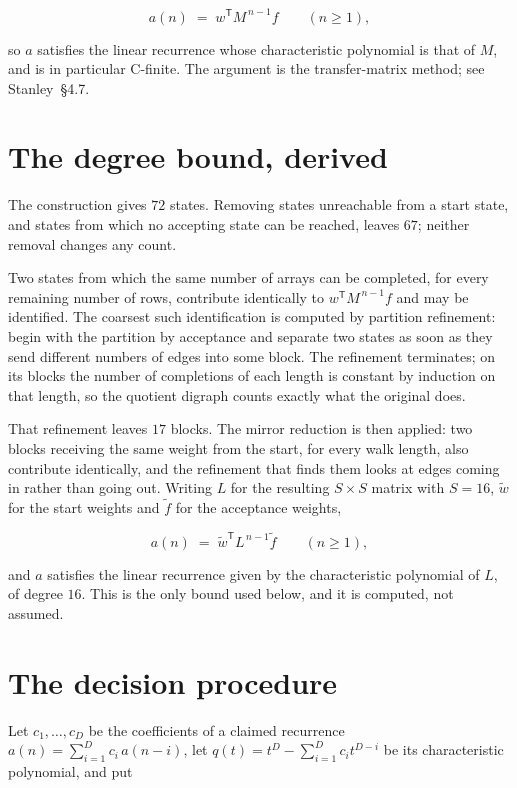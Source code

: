 \documentclass[11pt]{article}
\theoremstyle{definition}
\begin{document}
\[a(n) \;=\; w^{\mathsf T} M^{\,n-1} f \qquad (n \ge 1),\]

so $a$ satisfies the linear recurrence whose characteristic polynomial is that of $M$, and is in particular C-finite. The argument is the transfer-matrix method; see Stanley~\S4.7.

\section{The degree bound, derived}

The construction gives $72$ states. Removing states unreachable from a start state, and states from which no accepting state can be reached, leaves $67$; neither removal changes any count.

Two states from which the same number of arrays can be completed, for every remaining number of rows, contribute identically to $w^{\mathsf T}M^{\,n-1}f$ and may be identified. The coarsest such identification is computed by partition refinement: begin with the partition by acceptance and separate two states as soon as they send different numbers of edges into some block. The refinement terminates; on its blocks the number of completions of each length is constant by induction on that length, so the quotient digraph counts exactly what the original does.

That refinement leaves $17$ blocks. The mirror reduction is then applied: two blocks receiving the same weight from the start, for every walk length, also contribute identically, and the refinement that finds them looks at edges coming in rather than going out. Writing $L$ for the resulting $S \times S$ matrix with $S = 16$, $\tilde w$ for the start weights and $\tilde f$ for the acceptance weights,

\[a(n) \;=\; \tilde w^{\mathsf T} L^{\,n-1} \tilde f \qquad (n \ge 1),\]

and $a$ satisfies the linear recurrence given by the characteristic polynomial of $L$, of degree $16$. This is the only bound used below, and it is computed, not assumed.

\section{The decision procedure}

Let $c_1,\dots,c_D$ be the coefficients of a claimed recurrence $a(n) = \sum_{i=1}^{D} c_i\,a(n-i)$, let $q(t) = t^{D} - \sum_{i=1}^{D} c_i t^{D-i}$ be its characteristic polynomial, and put
\end{document}
